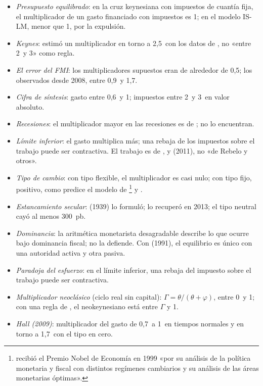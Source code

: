 \documentclass[11pt]{article}
\begin{document}
\begin{itemize}
\item \emph{Presupuesto equilibrado}: en la cruz keynesiana con impuestos de cuantía fija, el multiplicador de un gasto financiado con impuestos es 1\nocite{Haavelmo1945Multiplier}; en el modelo IS-LM, menor que 1, por la expulsión.
\item \emph{Keynes}: estimó un multiplicador en torno a 2,5~con los datos de , no «entre 2~y 3» como regla\nocite{Keynes1936}.
\item \emph{El error del FMI}: los multiplicadores supuestos eran de alrededor de 0,5; los observados desde 2008, entre 0,9~y 1,7\nocite{FMI2012WEOoct}.
\item \emph{Cifra de síntesis}: gasto entre 0,6~y 1; impuestos entre 2~y 3~en valor absoluto\nocite{Ramey2019Ten}.
\item \emph{Recesiones}: el multiplicador mayor en las recesiones es de \textcite{AuerbachGorodnichenko2012}; \textcite{RameyZubairy2018} no lo encuentran.
\item \emph{Límite inferior}: el gasto multiplica más; una rebaja de los impuestos sobre el trabajo puede ser contractiva\nocite{Eggertsson2011Fiscal}. El trabajo es de ,  y  (2011), no «de Rebelo y otros».
\item \emph{Tipo de cambio}: con tipo flexible, el multiplicador es casi nulo; con tipo fijo, positivo\nocite{IlzetzkiMendozaVegh2013}, como predice el modelo de \footnote{ recibió el Premio Nobel de Economía en 1999 «por su análisis de la política monetaria y fiscal con distintos regímenes cambiarios y su análisis de las áreas monetarias óptimas»\nocite{Nobel1999Mundell}.} y  .
\item \emph{Estancamiento secular}:  (1939) lo formuló;  lo recuperó en 2013; el tipo neutral cayó al menos 300~pb\nocite{RachelSummers2019Secular}.
\item \emph{Dominancia}: la aritmética monetarista desagradable\nocite{SargentWallace1981Some} describe lo que ocurre bajo dominancia fiscal; no la defiende. Con  (1991), el equilibrio es único con una autoridad activa y otra pasiva.
\item \emph{Paradoja del esfuerzo}: en el límite inferior, una rebaja del impuesto sobre el trabajo puede ser contractiva\nocite{Eggertsson2010Paradox}.
\item \emph{Multiplicador neoclásico} (ciclo real sin capital): $\Gamma=\theta/(\theta+\varphi)$, entre 0~y 1; con una regla de , el neokeynesiano está entre $\Gamma$ y 1\nocite{Woodford2011Simple}.
\item \emph{Hall (2009)}: multiplicador del gasto de 0,7~a 1~en tiempos normales y en torno a 1,7~con el tipo en cero\nocite{Hall2009By}.
\end{itemize}

\bibliografia
\end{document}
